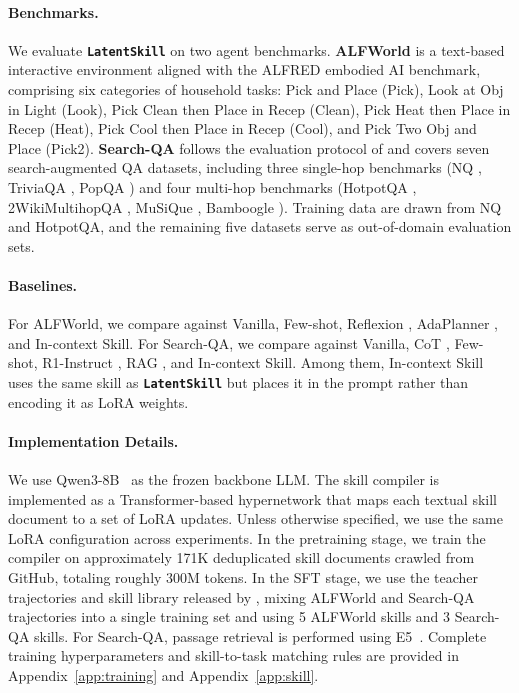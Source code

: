\documentclass{llmxive}
\providecommand{\textttt}[1]{\texttt{#1}}
\providecommand{\method}{\textbf{\textttt{LatentSkill}}}
\begin{document}
\paragraph{Benchmarks.}
We evaluate \method{} on two agent benchmarks. \textbf{ALFWorld} \citep{Shridhar2021ALFWorld} is a text-based interactive environment aligned with the ALFRED embodied AI benchmark, comprising six categories of household tasks: Pick and Place (Pick), Look at Obj in Light (Look), Pick Clean then Place in Recep (Clean), Pick Heat then Place in Recep (Heat), Pick Cool then Place in Recep (Cool), and Pick Two Obj and Place (Pick2). \textbf{Search-QA} follows the evaluation protocol of \citet{Jin2025SearchR1} and covers seven search-augmented QA datasets, including three single-hop benchmarks (NQ \citep{Kwiatkowski2019NQ}, TriviaQA \citep{Joshi2017TriviaQA}, PopQA \citep{Mallen2023PopQA}) and four multi-hop benchmarks (HotpotQA \citep{Yang2018HotpotQA}, 2WikiMultihopQA \citep{Ho2020Wiki}, MuSiQue \citep{Trivedi2022MuSiQue}, Bamboogle \citep{Press2023Bamboogle}). Training data are drawn from NQ and HotpotQA, and the remaining five datasets serve as out-of-domain evaluation sets.
 
\paragraph{Baselines.}
For ALFWorld, we compare against Vanilla, Few-shot, Reflexion \citep{Shinn2023Reflexion}, AdaPlanner \citep{Sun2023AdaPlanner}, and In-context Skill. For Search-QA, we compare against Vanilla, CoT \citep{Wei2022CoT}, Few-shot, R1-Instruct \citep{DeepSeek2025R1}, RAG \citep{Lewis2020RAG}, and In-context Skill. Among them, In-context Skill uses the same skill as \method{} but places it in the prompt rather than encoding it as LoRA weights.
 
\paragraph{Implementation Details.}
We use Qwen3-8B~\citep{Yang2025Qwen3} as the frozen backbone LLM. The skill compiler is implemented as a Transformer-based hypernetwork that maps each textual skill document to a set of LoRA updates. Unless otherwise specified, we use the same LoRA configuration across experiments. In the pretraining stage, we train the compiler on approximately 171K deduplicated skill documents crawled from GitHub, totaling roughly 300M tokens. In the SFT stage, we use the teacher trajectories and skill library released by \citet{Xia2026SkillRL}, mixing ALFWorld and Search-QA trajectories into a single training set and using 5 ALFWorld skills and 3 Search-QA skills. For Search-QA, passage retrieval is performed using E5~\citep{Wang2022E5}. Complete training hyperparameters and skill-to-task matching rules are provided in Appendix~\ref{app:training} and Appendix~\ref{app:skill}.
\end{document}
